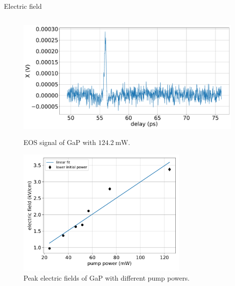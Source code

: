 \documentclass[aspectratio=1610, 9pt]{beamer}
\begin{document}
\begin{frame}{Electric field}
\begin{center}
\begin{columns}
\begin{column}{.5\textwidth}
\begin{figure}
      \begin{overprint}
        \includegraphics[width=\textwidth]{images/GaP14_55_42normalX.pdf}\caption{\textcolor{tugreen}{EOS signal} of GaP with $\SI{124.2}{\milli\W }$.}
        \includegraphics[width=0.75\textwidth]{images/eltric_field_GaP.pdf}\caption{\textcolor{tugreen}{Peak electric fields} of GaP with different pump powers.}
      \end{overprint}
    \end{figure}
  \end{column}
  \end{columns}
\end{center}
\end{frame}
\end{document}

